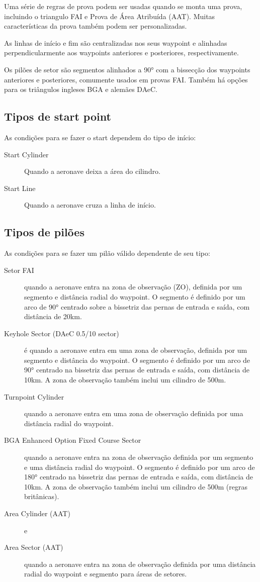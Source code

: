 Uma série de regras de prova podem ser usadas quando se monta uma prova, incluindo o triangulo FAI e Prova de Área Atribuída (AAT).  Muitas características da prova também podem ser personalizadas.

As linhas de início e fim são centralizadas nos seus waypoint e alinhadas perpendicularmente aos waypoints anteriores e posteriores, respectivamente.

Os pilões de setor são segmentos alinhados a 90° com a bissecção dos waypoints anteriores e posteriores, comumente usados em provas FAI.  Também há opções para os triângulos ingleses BGA e alemães DAeC.  

\subsection*{Tipos de start point}
As condições para se fazer o start dependem do tipo de início:
\begin{description}
\item[Start Cylinder] Quando a aeronave deixa a área do cilindro.
\item[Start Line] Quando a aeronave cruza a linha de início.
\end{description}

\subsection*{Tipos de pilões}
As condições para se fazer um pilão válido dependente de seu tipo:
\begin{description}
\item[Setor FAI] quando a aeronave entra na zona de observação (ZO), definida por um segmento e distância radial do waypoint.  O segmento é definido por um arco de 90° centrado sobre a bissetriz das pernas de entrada e saída, com distância de 20km.  
\item[Keyhole Sector (DAeC 0.5/10 sector)] é quando a aeronave entra em uma zona de observação, definida por um segmento e distância do waypoint. O segmento é definido por um arco de 90° centrado na bissetriz das pernas de entrada e saída, com distância de 10km.  A zona de observação também inclui um cilindro de 500m.
\item[Turnpoint Cylinder]  quando a aeronave entra em uma zona de observação definida por uma distância radial do waypoint.
\item[BGA Enhanced Option Fixed Course Sector]  quando a aeronave entra na zona de observação definida por um segmento e uma distância radial do waypoint.  O segmento é definido por um arco de 180° centrado na bissetriz das pernas de entrada e saída, com distância de 10km.  A zona de observação também inclui um cilindro de 500m (regras britânicas).
\item[Area Cylinder (AAT)]  e
\item[Area Sector (AAT)]  quando a aeronave entra na zona de observação definida por uma distância radial do waypoint e segmento para áreas de setores.

\end{description}

